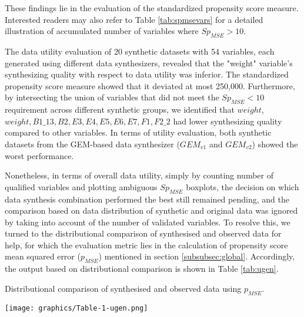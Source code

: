 These findings lie in the evaluation of the standardized propensity score measure. Interested readers may also refer to Table \ref{tab:spmsevars} for a detailed illustration of accumulated number of variables where $Sp_{MSE}>10$.

The data utility evaluation of 20 synthetic datasets with 54 variables, each generated using different data synthesizers, revealed that the "weight" variable's synthesizing quality with respect to data utility was inferior. The standardized propensity score measure showed that it deviated at most 250,000. Furthermore, by intersecting the union of variables that did not meet the $Sp_{MSE}<10$ requirement across different synthetic groups, we identified that $weight$, $weight, B1\_13, B2, E3, E4, E5, E6, E7, F1, F2\_2$ had lower synthesizing quality compared to other variables. In terms of utility evaluation, both synthetic datasets from the GEM-based data synthesizer ($GEM_{v1}$ and $GEM_{v2}$) showed the worst performance.

Nonetheless, in terms of overall data utility, simply by counting number of qualified variables and plotting ambiguous $Sp_{MSE}$ boxplots, the decision on which data synthesis combination performed the best still remained pending, and the comparison based on data distribution of synthetic and original data was ignored by taking into account of the number of validated variables. To resolve this, we turned to the distributional comparison of synthesised and observed data for help, for which the evaluation metric lies in the calculation of propensity score mean squared error ($p_{MSE}$) mentioned in section \ref{subsubsec:global}. Accordingly, the output based on distributional comparison is shown in Table \ref{tab:ugen}.
\begin{table}[H]
\centering
  \caption{Distributional comparison of synthesised and observed data using $p_{MSE}$.}
  \label{tab:ugen}
  \texttt{[image: graphics/Table-1-ugen.png]}
\end{table}

